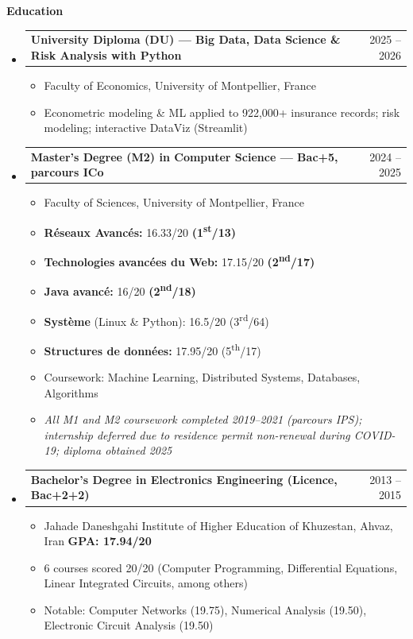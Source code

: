 \documentclass[11pt,a4paper]{article}
\makeatletter
\newcommand{\itemspace}{\vspace{0.4em}}
\newcommand{\sectionspace}{\itemspace}
\newcommand{\subspace}{\vspace{0.5em}}
\newcommand{\cvsection}[1]{
    \sectionspace
    \noindent\textcolor{primary}{\Large \textbf{#1}} \textcolor{primary}{\hrulefill}
    \par\vspace{0.4em}
}
\newcommand{\headerrow}[2]{
    \begin{tabular*}{\linewidth}{l@{\extracolsep{\fill}}r}
    #1 & \textcolor{primary}{#2} \\
    \end{tabular*}
}
\makeatother
\begin{document}
\cvsection{Education}
\begin{itemize}[leftmargin=1em, label={}]

    \item
    \headerrow{\textbf{University Diploma (DU) — Big Data, Data Science \& Risk Analysis with Python}}{2025 -- 2026}
    \begin{itemize}[leftmargin=1.5em, label=$\bullet$, nosep]
        \item Faculty of Economics, University of Montpellier, France
        \item Econometric modeling \& ML applied to 922,000+ insurance records; risk modeling; interactive DataViz (Streamlit)
    \end{itemize}

    \subspace
    \item
    \headerrow{\textbf{Master's Degree (M2) in Computer Science — Bac+5, parcours ICo}}{2024 -- 2025}
    \begin{itemize}[leftmargin=1.5em, label=$\bullet$, nosep]
        \item Faculty of Sciences, University of Montpellier, France
        \item \textbf{R\'eseaux Avanc\'es:} 16.33/20 \textbf{(1\textsuperscript{st}/13)}
        \item \textbf{Technologies avanc\'ees du Web:} 17.15/20 \textbf{(2\textsuperscript{nd}/17)}
        \item \textbf{Java avanc\'e:} 16/20 \textbf{(2\textsuperscript{nd}/18)}
        \item \textbf{Syst\`eme} (Linux \& Python): 16.5/20 (3\textsuperscript{rd}/64)
        \item \textbf{Structures de donn\'ees:} 17.95/20 (5\textsuperscript{th}/17)
        \item Coursework: Machine Learning, Distributed Systems, Databases, Algorithms
        \item \textit{All M1 and M2 coursework completed 2019--2021 (parcours IPS); internship deferred due to residence permit non-renewal during COVID-19; diploma obtained 2025}
    \end{itemize}

    \subspace
    \item
    \headerrow{\textbf{Bachelor's Degree in Electronics Engineering (Licence, Bac+2+2)}}{2013 -- 2015}
    \begin{itemize}[leftmargin=1.5em, label=$\bullet$, nosep]
        \item Jahade Daneshgahi Institute of Higher Education of Khuzestan, Ahvaz, Iran \quad \textbf{GPA: 17.94/20}
        \item 6 courses scored 20/20 (Computer Programming, Differential Equations, Linear Integrated Circuits, among others)
        \item Notable: Computer Networks (19.75), Numerical Analysis (19.50), Electronic Circuit Analysis (19.50)
    \end{itemize}

\end{itemize}
\end{document}
